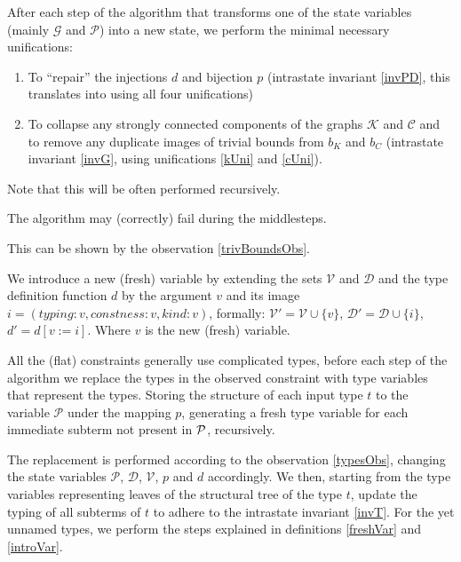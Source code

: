 \begin{defn}
    \label{middlesteps}

    After each step of the algorithm that transforms one of the state variables (mainly $\mathcal{G}$ and $\mathcal{P}$) into a new state, we perform the minimal necessary unifications:

    \begin{enumerate}
        \item To ``repair'' the injections $d$ and bijection $p$ (intrastate invariant \ref{invPD}, this translates into using all four unifications)

        \item To collapse any strongly connected components of the graphs $\mathcal{K}$ and  $\mathcal{C}$ and to remove any duplicate images of trivial bounds from $b_K$ and $b_C$ (intrastate invariant \ref{invG}, using unifications \ref{kUni} and \ref{cUni}).
    \end{enumerate}

    Note that this will be often performed recursively.
\end{defn}

\begin{lemma}
    The algorithm may (correctly) fail during the middlesteps.

    This can be shown by the observation \ref{trivBoundsObs}.
\end{lemma}

\begin{defn}
    \label{introVar}
    We introduce a new (fresh) variable by extending the sets $\mathcal{V}$ and $\mathcal{D}$
    and the type definition function $d$ by the argument $v$ and its image $i = (typing: v, constness: v, kind: v)$, formally: $\mathcal{V}' = \mathcal{V} \cup \{v\}$, $\mathcal{D}' = \mathcal{D} \cup \{i\}$, $d' = d [v := i]$. Where $v$ is the new (fresh) variable.
\end{defn}
\begin{defn}
    \label{presteps}

    All the (flat) constraints generally use complicated types, before each step of the algorithm we replace the types in the observed constraint with type variables that represent the types. Storing the structure of each input type $t$ to the variable $\mathcal P$ under the mapping $p$, generating a fresh type variable for each immediate subterm not present in $\mathcal P$, recursively.

    The replacement is performed according to the observation \ref{typesObs}, changing the state variables $\mathcal{P}$, $\mathcal{D}$, $\mathcal{V}$, $p$ and $d$ accordingly. We then, starting from the type variables representing leaves of the structural tree of the type $t$, update the typing of all subterms of $t$ to adhere to the intrastate invariant \ref{invT}. For the yet unnamed types, we perform the steps explained in definitions \ref{freshVar} and \ref{introVar}.
\end{defn}

